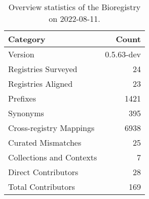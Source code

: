 \begin{table}
\centering
\caption{Overview statistics of the Bioregistry on 2022-08-11.}
\label{tab:bioregistry-summary}
\begin{tabular}{lr}
\toprule
                Category &      Count \\
\midrule
                 Version & 0.5.63-dev \\
     Registries Surveyed &         24 \\
      Registries Aligned &         23 \\
                Prefixes &       1421 \\
                Synonyms &        395 \\
 Cross-registry Mappings &       6938 \\
      Curated Mismatches &         25 \\
Collections and Contexts &          7 \\
     Direct Contributors &         28 \\
      Total Contributors &        169 \\
\bottomrule
\end{tabular}
\end{table}
